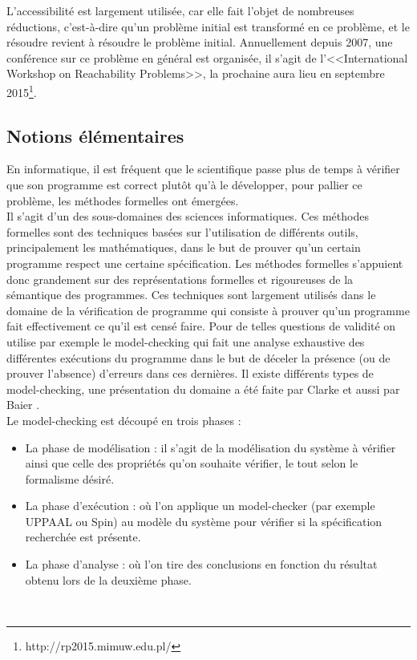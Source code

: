 \documentclass[a4paper]{report}
\theoremstyle{break}
\begin{document}
L'accessibilité est largement utilisée, car elle fait l'objet de nombreuses réductions, c'est-à-dire qu'un problème initial est transformé en ce problème, et le résoudre revient à résoudre le problème initial. Annuellement depuis 2007, une conférence sur ce problème en général est organisée, il s'agit de l'<<International Workshop on Reachability Problems>>, la prochaine aura lieu en septembre 2015\footnote{http://rp2015.mimuw.edu.pl/}.\\


\subsection{Notions élémentaires}
En informatique, il est fréquent que le scientifique passe plus de temps à vérifier que son programme est correct plutôt qu'à le développer, pour pallier ce problème, les méthodes formelles ont émergées.\\
Il s'agit d'un des sous-domaines des sciences informatiques. Ces méthodes formelles sont des techniques basées sur l'utilisation de différents outils, principalement les mathématiques, dans le but de prouver qu'un certain programme respect une certaine spécification. Les méthodes formelles s'appuient donc grandement sur des représentations formelles et rigoureuses de la sémantique des programmes. Ces techniques sont largement utilisés dans le domaine de la vérification de programme qui consiste à prouver qu'un programme fait effectivement ce qu'il est censé faire. Pour de telles questions de validité on utilise par exemple le model-checking qui fait une analyse exhaustive des différentes exécutions du programme dans le but de déceler la présence (ou de prouver l'absence) d'erreurs dans ces dernières. Il existe différents types de model-checking, une présentation du domaine a été faite par Clarke \cite{clarke1999model} et aussi par Baier \cite{baier2008principles}.\\

Le model-checking est découpé en trois phases :
\begin{itemize}
\item La phase de modélisation : il s'agit de la modélisation du système à vérifier ainsi que celle des propriétés qu'on souhaite vérifier, le tout selon le formalisme désiré.
\item La phase d'exécution : où l'on applique un model-checker (par exemple UPPAAL ou Spin) au modèle du système pour vérifier si la spécification recherchée est présente.
\item La phase d'analyse : où l'on tire des conclusions en fonction du résultat obtenu lors de la deuxième phase.
\end{itemize}
\phantom\\
\end{document}
